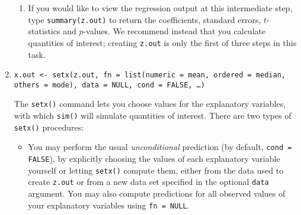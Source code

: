 \begin{enumerate}
\begin{enumerate}
\item If you would like to view the regression output at this
  intermediate step, type {\tt summary(z.out)} to return the
  coefficients, standard errors, $t$-statistics and $p$-values.  We
  recommend instead that you calculate quantities of interest;
  creating {\tt z.out} is only the first of three steps in this task.
  \end{enumerate}
  
\item {\tt x.out <- setx(z.out, fn = list(numeric = mean, ordered =
    median, others = mode), data = NULL, cond = FALSE, \dots)}
 
  The {\tt setx()} command lets you choose values for the explanatory
  variables, with which {\tt sim()} will simulate quantities of
  interest.  There are two types of {\tt setx()} procedures:
\begin{itemize}
\item You may perform the usual \emph{unconditional} prediction (by
  default, {\tt cond = FALSE}), by explicitly choosing the values of
  each explanatory variable yourself or letting {\tt setx()} compute
  them, either from the data used to create {\tt z.out} or from a new
  data set specified in the optional {\tt data} argument.  You may
  also compute predictions for all observed values of your explanatory
  variables using {\tt fn = NULL}.
  

\end{itemize}
\end{enumerate}
